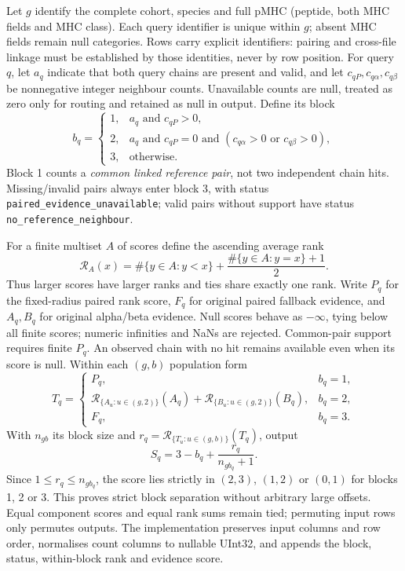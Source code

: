 \documentclass[10pt,a4paper]{article}
\theoremstyle{definition}
\newcommand{\code}[1]{\texttt{\small #1}}
\begin{document}
Let $g$ identify the complete cohort, species and full pMHC (peptide, both MHC fields and MHC
class). Each query identifier is unique within $g$; absent MHC fields remain null categories.
Rows carry explicit identifiers: pairing and cross-file linkage must be established by those
identities, never by row position. For query $q$, let $a_q$ indicate that both query chains are
present and valid, and let $c_{qP},c_{q\alpha},c_{q\beta}$ be nonnegative integer neighbour counts.
Unavailable counts are null, treated as zero only for routing and retained as null in output.
Define its block
\[
b_q=\begin{cases}
1,&a_q\text{ and }c_{qP}>0,\\
2,&a_q\text{ and }c_{qP}=0\text{ and }(c_{q\alpha}>0\text{ or }c_{q\beta}>0),\\
3,&\text{otherwise}.
\end{cases}
\]
Block 1 counts a \emph{common linked reference pair}, not two independent chain hits.
Missing/invalid pairs always enter block 3, with status \code{paired\_evidence\_unavailable};
valid pairs without support have status \code{no\_reference\_neighbour}.

For a finite multiset $A$ of scores define the ascending average rank
\[
\mathcal R_A(x)=\#\{y\in A:y<x\}+\frac{\#\{y\in A:y=x\}+1}{2}.
\]
Thus larger scores have larger ranks and ties share exactly one rank. Write $P_q$ for the
fixed-radius paired rank score, $F_q$ for original paired fallback evidence, and
$A_q,B_q$ for original alpha/beta evidence. Null scores behave as $-\infty$, tying below all
finite scores; numeric infinities and NaNs are rejected. Common-pair support requires finite
$P_q$. An observed chain with no hit remains available even when its score is null.
Within each $(g,b)$ population form
\[
T_q=\begin{cases}
P_q,&b_q=1,\\
\mathcal R_{\{A_u:u\in(g,2)\}}(A_q)+
\mathcal R_{\{B_u:u\in(g,2)\}}(B_q),&b_q=2,\\
F_q,&b_q=3.
\end{cases}
\]
With $n_{gb}$ its block size and $r_q=\mathcal R_{\{T_u:u\in(g,b)\}}(T_q)$, output
\[
S_q=3-b_q+\frac{r_q}{n_{gb_q}+1}.
\]
Since $1\le r_q\le n_{gb_q}$, the score lies strictly in $(2,3)$, $(1,2)$ or $(0,1)$ for
blocks 1, 2 or 3. This proves strict block separation without arbitrary large offsets.
Equal component scores and equal rank sums remain tied; permuting input rows only permutes outputs.
The implementation preserves input columns and row order, normalises count columns to nullable
UInt32, and appends the block, status, within-block rank and evidence score.
\end{document}
